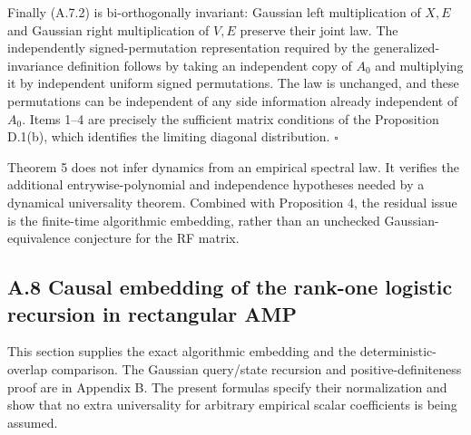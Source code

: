 \documentclass[
  11pt,
  a4paper,
]{article}
\begin{document}
Finally (A.7.2) is bi-orthogonally invariant: Gaussian left
multiplication of \(X,E\) and Gaussian right multiplication of \(V,E\)
preserve their joint law. The independently signed-permutation
representation required by the generalized-invariance definition follows
by taking an independent copy of \(A_0\) and multiplying it by
independent uniform signed permutations. The law is unchanged, and these
permutations can be independent of any side information already
independent of \(A_0\). Items 1--4 are precisely the sufficient matrix
conditions of the Proposition D.1(b), which identifies the limiting
diagonal distribution. \(\square\)

Theorem 5 does not infer dynamics from an empirical spectral law. It
verifies the additional entrywise-polynomial and independence hypotheses
needed by a dynamical universality theorem. Combined with Proposition 4,
the residual issue is the finite-time algorithmic embedding, rather than
an unchecked Gaussian-equivalence conjecture for the RF matrix.

\hypertarget{a.8-causal-embedding-of-the-rank-one-logistic-recursion-in-rectangular-amp}{%
\subsection{A.8 Causal embedding of the rank-one logistic recursion in
rectangular
AMP}\label{a.8-causal-embedding-of-the-rank-one-logistic-recursion-in-rectangular-amp}}

This section supplies the exact algorithmic embedding and the
deterministic-overlap comparison. The Gaussian query/state recursion and
positive-definiteness proof are in Appendix B. The present formulas
specify their normalization and show that no extra universality for
arbitrary empirical scalar coefficients is being assumed.
\end{document}

